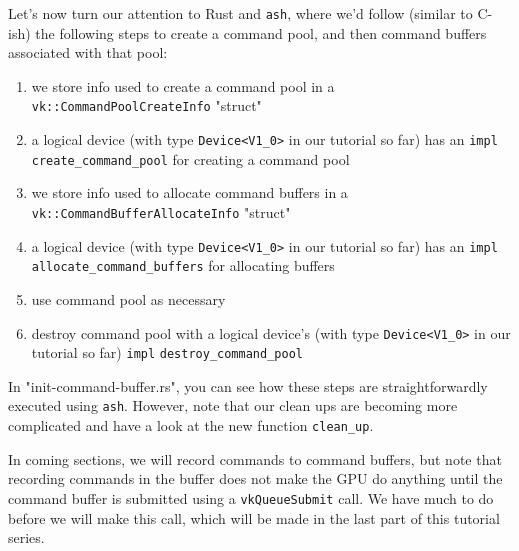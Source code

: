 \documentclass[12pt,letterpaper]{article}
\newcommand{\ril}[1]{\texttt{#1}}
\newcommand{\cil}[1]{\texttt{#1}}
\newcommand{\ash}{\texttt{ash}}
\begin{document}
	Let's now turn our attention to Rust and \ash, where we'd follow (similar to C-ish) the following steps to create a command pool, and then command buffers associated with that pool:
		\begin{enumerate}
			\item we store info used to create a command pool in a \ril{vk::CommandPoolCreateInfo} "struct"
			
			\item a logical device (with type \ril{Device<V1_0>} in our tutorial so far) has an \ril{impl} \ril{create_command_pool} for creating a command pool
			
			\item we store info used to allocate command buffers in a \ril{vk::CommandBufferAllocateInfo} "struct"
			
			\item a logical device (with type \ril{Device<V1_0>} in our tutorial so far) has an \ril{impl} \ril{allocate_command_buffers} for allocating buffers
			
			\item use command pool as necessary
			
			\item destroy command pool with a logical device's (with type \ril{Device<V1_0>} in our tutorial so far) \ril{impl} \ril{destroy_command_pool}
		\end{enumerate}
	In "init-command-buffer.rs", you can see how these steps are straightforwardly executed using \ash. However, note that our clean ups are becoming more complicated and have a look at the new function \ril{clean_up}. 
	
	In coming sections, we will record commands to command buffers, but note that recording commands in the buffer does not make the GPU do anything until the command buffer is submitted using a \cil{vkQueueSubmit} call. We have much to do before we will make this call, which will be made in the last part of this tutorial series.
	
\end{document}
